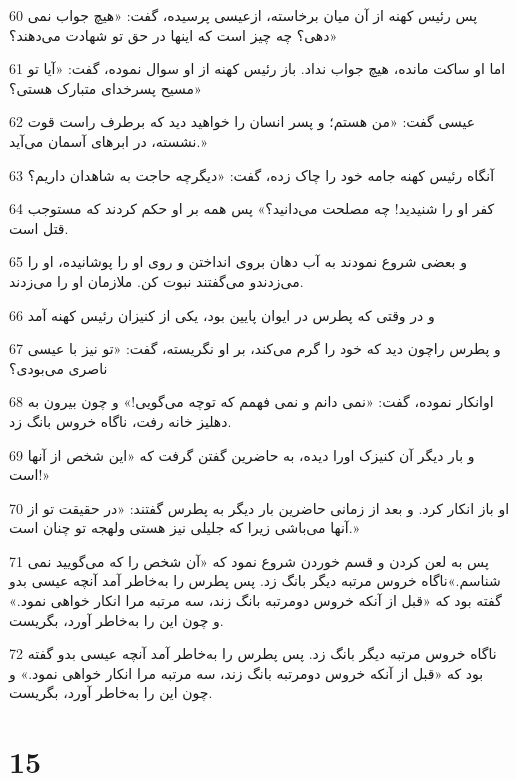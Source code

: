 \par 60 پس رئیس کهنه از آن میان برخاسته، ازعیسی پرسیده، گفت: «هیچ جواب نمی دهی؟ چه چیز است که اینها در حق تو شهادت می‌دهند؟»
\par 61 اما او ساکت مانده، هیچ جواب نداد. باز رئیس کهنه از او سوال نموده، گفت: «آیا تو مسیح پسرخدای متبارک هستی؟»
\par 62 عیسی گفت: «من هستم؛ و پسر انسان را خواهید دید که برطرف راست قوت نشسته، در ابرهای آسمان می‌آید.»
\par 63 آنگاه رئیس کهنه جامه خود را چاک زده، گفت: «دیگر‌چه حاجت به شاهدان داریم؟
\par 64 کفر او را شنیدید! چه مصلحت می‌دانید؟» پس همه بر او حکم کردند که مستوجب قتل است.
\par 65 و بعضی شروع نمودند به آب دهان بروی انداختن و روی او را پوشانیده، او را می‌زدندو می‌گفتند نبوت کن. ملازمان او را می‌زدند.
\par 66 و در وقتی که پطرس در ایوان پایین بود، یکی از کنیزان رئیس کهنه آمد
\par 67 و پطرس راچون دید که خود را گرم می‌کند، بر او نگریسته، گفت: «تو نیز با عیسی ناصری می‌بودی؟
\par 68 اوانکار نموده، گفت: «نمی دانم و نمی فهمم که توچه می‌گویی!» و چون بیرون به دهلیز خانه رفت، ناگاه خروس بانگ زد.
\par 69 و بار دیگر آن کنیزک اورا دیده، به حاضرین گفتن گرفت که «این شخص از آنها است!»
\par 70 او باز انکار کرد. و بعد از زمانی حاضرین بار دیگر به پطرس گفتند: «در حقیقت تو از آنها می‌باشی زیرا که جلیلی نیز هستی ولهجه تو چنان است.»
\par 71 پس به لعن کردن و قسم خوردن شروع نمود که «آن شخص را که می‌گویید نمی شناسم.»ناگاه خروس مرتبه دیگر بانگ زد. پس پطرس را به‌خاطر آمد آنچه عیسی بدو گفته بود که «قبل از آنکه خروس دومرتبه بانگ زند، سه مرتبه مرا انکار خواهی نمود.» و چون این را به‌خاطر آورد، بگریست.
\par 72 ناگاه خروس مرتبه دیگر بانگ زد. پس پطرس را به‌خاطر آمد آنچه عیسی بدو گفته بود که «قبل از آنکه خروس دومرتبه بانگ زند، سه مرتبه مرا انکار خواهی نمود.» و چون این را به‌خاطر آورد، بگریست.

\chapter{15}


